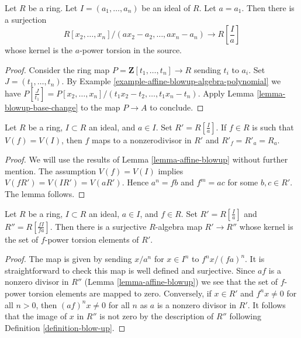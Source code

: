 \begin{lemma}
\label{lemma-affine-blowup-quotient-description}
Let $R$ be a ring. Let $I = (a_1, \ldots, a_n)$ be an ideal of $R$.
Let $a = a_1$. Then there is a surjection
$$
R[x_2, \ldots, x_n]/(a x_2 - a_2, \ldots, a x_n - a_n)
\longrightarrow
\textstyle{R[\frac{I}{a}]}
$$
whose kernel is the $a$-power torsion in the source.
\end{lemma}

\begin{proof}
Consider the ring map $P = \mathbf{Z}[t_1, \ldots, t_n] \to R$
sending $t_i$ to $a_i$. Set $J = (t_1, \ldots, t_n)$.
By Example \ref{example-affine-blowup-algebra-polynomial} we have
$P[\frac{J}{t_1}] =
P[x_2, \ldots, x_n]/(t_1 x_2 - t_2, \ldots, t_1 x_n - t_n)$.
Apply Lemma \ref{lemma-blowup-base-change} to the map $P \to A$ to conclude.
\end{proof}

\begin{lemma}
\label{lemma-blowup-in-principal}
Let $R$ be a ring, $I \subset R$ an ideal, and $a \in I$.
Set $R' = R[\frac{I}{a}]$. If $f \in R$ is such that $V(f) = V(I)$,
then $f$ maps to a nonzerodivisor in $R'$ and $R'_f = R'_a = R_a$.
\end{lemma}

\begin{proof}
We will use the results of Lemma \ref{lemma-affine-blowup}
without further mention.
The assumption $V(f) = V(I)$ implies $V(fR') = V(IR') = V(aR')$.
Hence $a^n = fb$ and $f^m = ac$ for some $b, c \in R'$.
The lemma follows.
\end{proof}

\begin{lemma}
\label{lemma-blowup-add-principal}
Let $R$ be a ring, $I \subset R$ an ideal, $a \in I$, and $f \in R$.
Set $R' = R[\frac{I}{a}]$ and $R'' = R[\frac{fI}{fa}]$. Then
there is a surjective $R$-algebra map $R' \to R''$ whose kernel
is the set of $f$-power torsion elements of $R'$.
\end{lemma}

\begin{proof}
The map is given by sending $x/a^n$ for $x \in I^n$ to $f^nx/(fa)^n$.
It is straightforward to check this map is well defined and surjective.
Since $af$ is a nonzero divisor in $R''$
(Lemma \ref{lemma-affine-blowup}) we see that the set of $f$-power
torsion elements are mapped to zero. Conversely, if $x \in R'$
and $f^n x \not = 0$ for all $n > 0$, then $(af)^n x \not = 0$
for all $n$ as $a$ is a nonzero divisor in $R'$. It follows
that the image of $x$ in $R''$ is not zero by the description of
$R''$ following Definition \ref{definition-blow-up}.
\end{proof}

